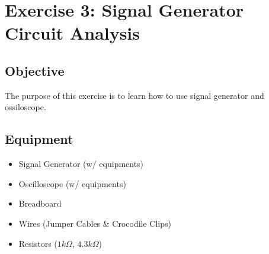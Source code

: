 \section{Exercise 3: Signal Generator Circuit Analysis}

\subsection{Objective}
The purpose of this exercise is to learn how to use signal generator and ossiloscope. 

\subsection{Equipment}
\begin{itemize}
    \item Signal Generator (w/ equipments)
    \item Oscilloscope (w/ equipments)
    \item Breadboard
    \item Wires (Jumper Cables \& Crocodile Clips)
    \item Resistors ($1k\Omega$, $4.3k\Omega$)
\end{itemize}

